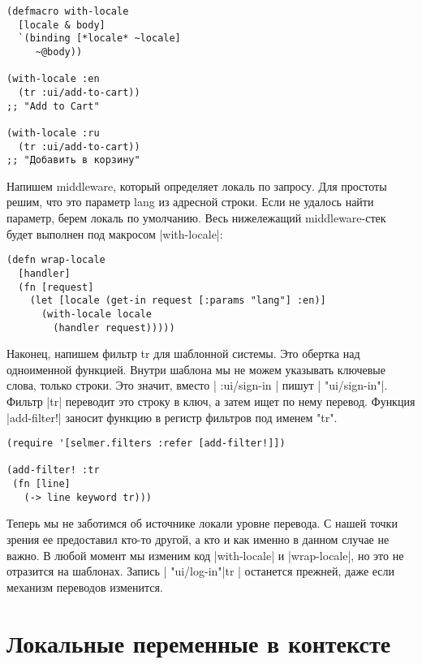 {{{{\begin{verbatim}
(defmacro with-locale
  [locale & body]
  `(binding [*locale* ~locale]
     ~@body))

(with-locale :en
  (tr :ui/add-to-cart))
;; "Add to Cart"

(with-locale :ru
  (tr :ui/add-to-cart))
;; "Добавить в корзину"
\end{verbatim}

Напишем middleware, который определяет локаль по запросу. Для простоты решим,
что это параметр lang из адресной строки. Если не удалось найти параметр, берем
локаль по умолчанию. Весь нижележащий middleware-стек будет выполнен под
макросом \spverb|with-locale|:

\begin{verbatim}
(defn wrap-locale
  [handler]
  (fn [request]
    (let [locale (get-in request [:params "lang"] :en)]
      (with-locale locale
        (handler request)))))
\end{verbatim}

{%

Наконец, напишем фильтр tr для шаблонной системы. Это обертка над одноименной
функцией. Внутри шаблона мы не можем указывать ключевые слова, только
строки. Это значит, вместо \spverb|{{ :ui/sign-in }}| пишут \spverb|{{ "ui/sign-in"}}|.
Фильтр \spverb|tr| переводит это строку в ключ, а затем ищет по нему
перевод. Функция \spverb|add-filter!| заносит функцию в регистр фильтров под именем
"tr".

{%

\begin{verbatim}
(require '[selmer.filters :refer [add-filter!]])

(add-filter! :tr
 (fn [line]
   (-> line keyword tr)))
\end{verbatim}

{%

Теперь мы не заботимся об источнике локали уровне перевода. С нашей точки зрения
ее предоставил кто-то другой, а кто и как именно в данном случае не важно. В
любой момент мы изменим код \spverb|with-locale| и \spverb|wrap-locale|, но это не отразится
на шаблонах. Запись \spverb|{{ "ui/log-in"|tr }}| останется прежней, даже если механизм
переводов изменится.

{%

\section{Локальные переменные в контексте}

}}}}}}}}
